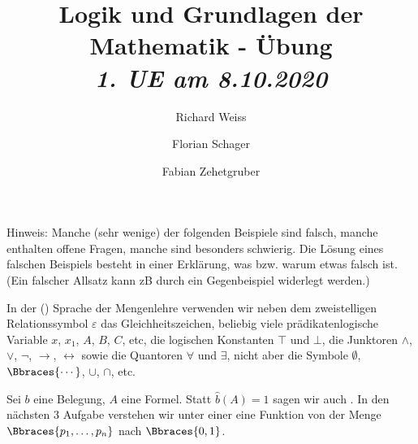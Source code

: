 \documentclass{article}
\title
{
  Logik und Grundlagen der Mathematik - Übung \\
  \vspace{4pt}
  \normalsize
  \textit{1. UE am 8.10.2020}
}
\author
{
  Richard Weiss
  \and
  Florian Schager
  \and
  Fabian Zehetgruber
}
\date{}
\begin{document}
\maketitle

Hinweis:
Manche (sehr wenige) der folgenden Beispiele sind falsch, manche enthalten offene Fragen, manche sind besonders schwierig.
Die Lösung eines falschen Beispiels besteht in einer Erklärung, was bzw. warum etwas falsch ist.
(Ein falscher Allsatz kann zB durch ein Gegenbeispiel widerlegt werden.)




\phantom{}

In der () Sprache der Mengenlehre verwenden wir neben dem zweistelligen Relationssymbol $\varepsilon$ das Gleichheitszeichen, beliebig viele prädikatenlogische Variable $x$, $x_1$, $A$, $B$, $C$, etc, die logischen Konstanten $\top$ und $\bot$, die Junktoren $\land$, $\lor$, $\neg$, $\to$, $\leftrightarrow$ sowie die Quantoren $\forall$ und $\exists$, nicht aber die Symbole $\emptyset$, $\Bbraces{\cdots}$, $\cup$, $\cap$, etc.







\phantom{}

Sei $b$ eine Belegung, $A$ eine Formel.
Statt $\hat{b}(A) = 1$ sagen wir auch .
In den nächsten 3 Aufgabe verstehen wir unter einer  eine Funktion von der Menge $\Bbraces{p_1, \ldots, p_n}$ nach $\Bbraces{0, 1}$.



\end{document}
